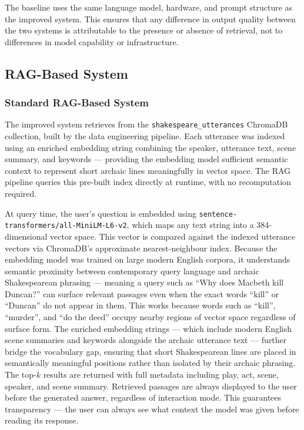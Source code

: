 \documentclass[10pt,conference]{IEEEtran}
\begin{document}
The baseline uses the same language model, hardware, and prompt structure as the improved
system. This ensures that any difference in output quality between the two systems is
attributable to the presence or absence of retrieval, not to differences in model capability
or infrastructure.

\subsection{RAG-Based System}

\subsubsection{Standard RAG-Based System}

The improved system retrieves from the \texttt{shakespeare\_utterances} ChromaDB collection,
built by the data engineering pipeline. Each utterance was indexed using an enriched
embedding string combining the speaker, utterance text, scene summary, and keywords ---
providing the embedding model sufficient semantic context to represent short archaic lines
meaningfully in vector space. The RAG pipeline queries this pre-built index directly at
runtime, with no recomputation required.

At query time, the user's question is embedded using
\texttt{sentence-transformers/all-MiniLM-L6-v2}, which maps any text string into a
384-dimensional vector space. This vector is compared against the indexed utterance vectors
via ChromaDB's approximate nearest-neighbour index. Because the embedding model was trained on large modern English
corpora, it understands semantic proximity between contemporary
query language and archaic Shakespearean phrasing --- meaning a
query such as ``Why does Macbeth kill Duncan?'' can surface relevant
passages even when the exact words ``kill'' or ``Duncan'' do not
appear in them. This works because words such as ``kill'',
``murder'', and ``do the deed'' occupy nearby regions of vector
space regardless of surface form. The enriched embedding strings
--- which include modern English scene summaries and keywords
alongside the archaic utterance text --- further bridge the
vocabulary gap, ensuring that short Shakespearean lines are placed
in semantically meaningful positions rather than isolated by their
archaic phrasing.
The top-$k$ results are returned with full
metadata including play, act, scene, speaker, and scene summary. Retrieved passages are
always displayed to the user before the generated answer, regardless of interaction mode.
This guarantees transparency --- the user can always see what context the model was given
before reading its response.
\end{document}
